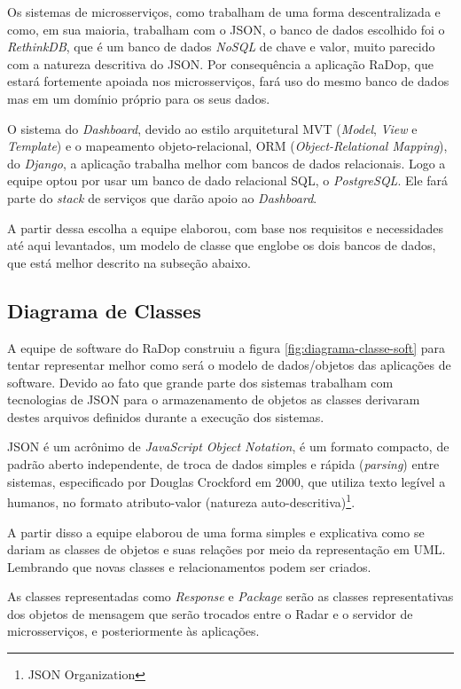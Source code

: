 Os sistemas de microsserviços, como trabalham de uma forma descentralizada e como, em sua maioria, trabalham com o JSON, o banco de dados escolhido foi o \textit{RethinkDB}, que é um banco de dados \textit{NoSQL} de chave e valor, muito parecido com a natureza descritiva do JSON. Por consequência a aplicação RaDop, que estará fortemente apoiada nos microsserviços, fará uso do mesmo banco de dados mas em um domínio próprio para os seus dados.

O sistema do \textit{Dashboard}, devido ao estilo arquitetural MVT (\textit{Model}, \textit{View} e \textit{Template}) e o mapeamento objeto-relacional, ORM (\textit{Object-Relational Mapping}), do \textit{Django}, a aplicação trabalha melhor com bancos de dados relacionais. Logo a equipe optou por usar um banco de dado relacional SQL, o \textit{PostgreSQL}. Ele fará parte do \textit{stack} de serviços que darão apoio ao \textit{Dashboard}.

A partir dessa escolha a equipe elaborou, com base nos requisitos e necessidades até aqui levantados, um modelo de classe que englobe os dois bancos de dados, que está melhor descrito na subseção abaixo.

\subsection{Diagrama de Classes}

A equipe de software do RaDop construiu a figura \ref{fig:diagrama-classe-soft} para tentar representar melhor como será o modelo de dados/objetos das aplicações de software. Devido ao fato que grande parte dos sistemas trabalham com tecnologias de JSON para o armazenamento de objetos as classes derivaram destes arquivos definidos durante a execução dos sistemas.

JSON é um acrônimo de \textit{JavaScript Object Notation}, é um formato compacto, de padrão aberto independente, de troca de dados simples e rápida (\textit{parsing}) entre sistemas, especificado por Douglas Crockford em 2000, que utiliza texto legível a humanos, no formato atributo-valor (natureza auto-descritiva)\footnote{JSON Organization}.

A partir disso a equipe elaborou de uma forma simples e explicativa como se dariam as classes de objetos e suas relações por meio da representação em UML. Lembrando que novas classes e relacionamentos podem ser criados.

As classes representadas como \textit{Response} e \textit{Package} serão as classes representativas dos objetos de mensagem que serão trocados entre o Radar e o servidor de microsserviços, e posteriormente às aplicações.

